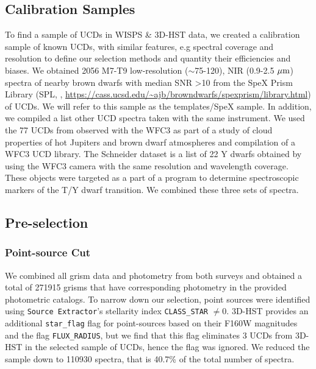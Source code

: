 \documentclass[manuscript]{aastex63}
\begin{document}
\subsection{Calibration Samples}\label{trainset}

To find a sample of UCDs in WISPS \& 3D-HST data, we created a calibration sample of known UCDs, with similar features, e.g spectral coverage and resolution to define our selection methods and quantity their efficiencies and biases. We obtained 2056 M7-T9 low-resolution ($\sim$75-120), NIR (0.9-2.5 $\mbox{$\mu$m}$) spectra of nearby brown dwarfs with median SNR \textgreater 10 from the SpeX Prism Library (SPL, \citealt{2014arXiv1406.4887B}, \url{https://cass.ucsd.edu/~ajb/browndwarfs/spexprism/library.html}) of UCDs. We will refer to this sample as the templates/SpeX sample. In addition, we compiled a list other UCD spectra taken with the same instrument. We used the 77 UCDs from \cite{Manjavacas2018} observed with the WFC3 as part of a study of cloud properties of hot Jupiters and brown dwarf atmospheres and compilation of a WFC3 UCD library. The Schneider dataset is a list of 22 Y dwarfs obtained by \cite{Schneider2015} using the WFC3 camera with the same resolution and wavelength coverage. These objects were targeted as a part of a program to determine spectroscopic markers of the T/Y dwarf transition. We combined these three sets of spectra. 

\subsection{Pre-selection}

\subsubsection{Point-source Cut}

We combined all grism data and photometry from both surveys and obtained a total of 271915 grisms that have corresponding photometry in the provided photometric catalogs. To narrow down our selection, point sources were identified using \texttt{Source Extractor}'s stellarity index \texttt{CLASS\_STAR} $\neq$0. 3D-HST provides an additional \texttt{star\_flag} flag for point-sources based on their F160W magnitudes and the flag \texttt{FLUX\_RADIUS}, but we find that this flag eliminates 3 UCDs from 3D-HST in the selected sample of UCDs, hence the flag was ignored. We reduced the sample down to 110930 spectra, that is 40.7\% of the total number of spectra.
\end{document}

